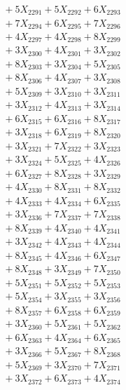 \documentclass[a4paper,10pt]{article}
\begin{document}
{\begin{align}
&\;  + 5 X_{2291} + 5 X_{2292} + 6 X_{2293} \\[0.3ex]
&\;  + 7 X_{2294} + 6 X_{2295} + 7 X_{2296} \\[0.3ex]
&\;  + 4 X_{2297} + 4 X_{2298} + 8 X_{2299} \\[0.3ex]
&\;  + 3 X_{2300} + 4 X_{2301} + 3 X_{2302} \\[0.3ex]
&\;  + 8 X_{2303} + 3 X_{2304} + 5 X_{2305} \\[0.3ex]
&\;  + 8 X_{2306} + 4 X_{2307} + 3 X_{2308} \\[0.3ex]
&\;  + 5 X_{2309} + 3 X_{2310} + 3 X_{2311} \\[0.3ex]
&\;  + 3 X_{2312} + 4 X_{2313} + 3 X_{2314} \\[0.3ex]
&\;  + 6 X_{2315} + 6 X_{2316} + 8 X_{2317} \\[0.3ex]
&\;  + 3 X_{2318} + 6 X_{2319} + 8 X_{2320} \\[0.5ex]\allowbreak
&\;  + 3 X_{2321} + 7 X_{2322} + 3 X_{2323} \\[0.3ex]
&\;  + 3 X_{2324} + 5 X_{2325} + 4 X_{2326} \\[0.3ex]
&\;  + 6 X_{2327} + 8 X_{2328} + 3 X_{2329} \\[0.3ex]
&\;  + 4 X_{2330} + 8 X_{2331} + 8 X_{2332} \\[0.3ex]
&\;  + 4 X_{2333} + 4 X_{2334} + 6 X_{2335} \\[0.3ex]
&\;  + 3 X_{2336} + 7 X_{2337} + 7 X_{2338} \\[0.3ex]
&\;  + 8 X_{2339} + 4 X_{2340} + 4 X_{2341} \\[0.3ex]
&\;  + 3 X_{2342} + 4 X_{2343} + 4 X_{2344} \\[0.3ex]
&\;  + 8 X_{2345} + 4 X_{2346} + 6 X_{2347} \\[0.3ex]
&\;  + 8 X_{2348} + 3 X_{2349} + 7 X_{2350} \\[0.5ex]\allowbreak
&\;  + 5 X_{2351} + 5 X_{2352} + 5 X_{2353} \\[0.3ex]
&\;  + 5 X_{2354} + 3 X_{2355} + 3 X_{2356} \\[0.3ex]
&\;  + 8 X_{2357} + 6 X_{2358} + 6 X_{2359} \\[0.3ex]
&\;  + 3 X_{2360} + 5 X_{2361} + 5 X_{2362} \\[0.3ex]
&\;  + 6 X_{2363} + 4 X_{2364} + 6 X_{2365} \\[0.3ex]
&\;  + 3 X_{2366} + 5 X_{2367} + 8 X_{2368} \\[0.3ex]
&\;  + 5 X_{2369} + 3 X_{2370} + 7 X_{2371} \\[0.3ex]
&\;  + 3 X_{2372} + 6 X_{2373} + 4 X_{2374} \\[0.3ex]

\end{align}}
\end{document}
